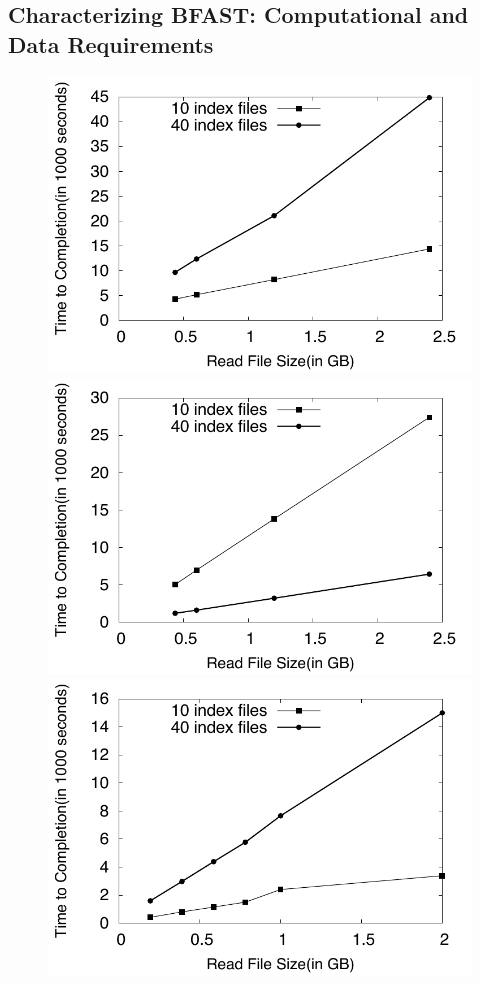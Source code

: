 \documentclass{acm_proc_article-sp}
\begin{document}
\subsection{Characterizing BFAST: Computational and Data Requirements}


\begin{figure}
 \centering
\includegraphics[scale=0.66]{figures/readsvstime_hg18.pdf}
\includegraphics[scale=0.66]{figures/readsvstime_hg18_chr21.pdf}
\includegraphics[scale=0.66]{figures/readsvstime_bglumae.pdf}



\end{figure}
\end{document}
